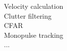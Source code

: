 \documentclass[preview]{standalone}
\begin{document}
Velocity calculation\\Clutter filtering\\CFAR\\Monopulse tracking\\...\\
\end{document}
